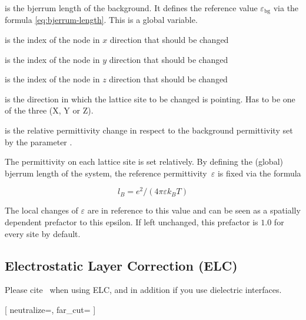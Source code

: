 \begin{arguments}
\item[\var{l_B}] is the bjerrum length of the background. It defines
	the reference value $\varepsilon_\text{bg}$ via the formula 
	\eqref{eq:bjerrum-length}. This is a global variable.
\item[\var{node\_x}] is the index of the node in $x$ direction that
	should be changed
\item[\var{node\_y}] is the index of the node in $y$ direction that
	should be changed
\item[\var{node\_z}] is the index of the node in $z$ direction that
	should be changed
\item[\var{X/Y/Z}] is the direction in which the lattice site to be
	changed is pointing. Has to be one of the three (X, Y or Z).
\item[\var{\varepsilon}] is the relative permittivity change in
	respect to the background permittivity set by the parameter
	.
\end{arguments}

The permittivity on each lattice site is set relatively. By defining
the (global) bjerrum length of the system, the reference
permittivity~$\varepsilon$ is fixed via the formula

\begin{equation}
l_B = e^2 / (4 \pi \varepsilon k_B T)
\label{eq:bjerrum-length}
\end{equation}

The local changes of $\varepsilon$ are in reference to this value
and can be seen as a spatially dependent prefactor to this epsilon.
If left unchanged, this prefactor is $1.0$ for every site by
default.

\subsection{Electrostatic Layer Correction (ELC)}

\begin{citebox}
  Please cite~ when using ELC, and in addition
   if you use dielectric interfaces.
\end{citebox}

\PythonSyntaxOn
\begin{pysyntax}
  [
    neutralize=,
    far_cut=
  ]
\end{pysyntax}
\PythonSyntaxOff

